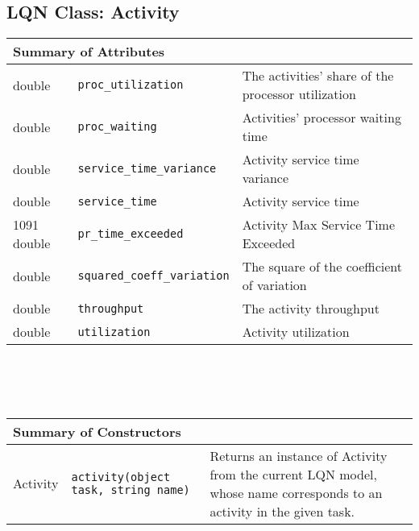 \subsection{LQN Class: Activity}
\begin{tabular}{|p{1.0in}|p{2.3in}||p{2.8in}|}
  \hline
  \multicolumn{3}{|l|}{\textbf{Summary of Attributes}}\\
  \hline
  double & {\tt proc\_utilization} & The activities' share of the processor utilization\\
  double & {\tt proc\_waiting} & Activities' processor waiting time\\
  double & {\tt service\_time\_variance} & Activity service time variance\\
  double & {\tt service\_time} & Activity service time\\
1091  double & {\tt pr\_time\_exceeded} & Activity Max Service Time Exceeded\\
  double & {\tt squared\_coeff\_variation} & The square of the coefficient of variation\\
  double & {\tt throughput} & The activity throughput\\
  double & {\tt utilization} & Activity utilization\\
  \hline
\end{tabular}
\\\\\ \\
\begin{tabular}{|p{1.0in}|p{2.3in}||p{2.8in}|}
  \hline
  \multicolumn{3}{|l|}{\textbf{Summary of Constructors}}\\
  \hline
  Activity & {\tt activity(object task, string name)} & Returns an instance of Activity from the current LQN model, whose name corresponds to an activity in the given task.\\
  \hline
\end{tabular}

